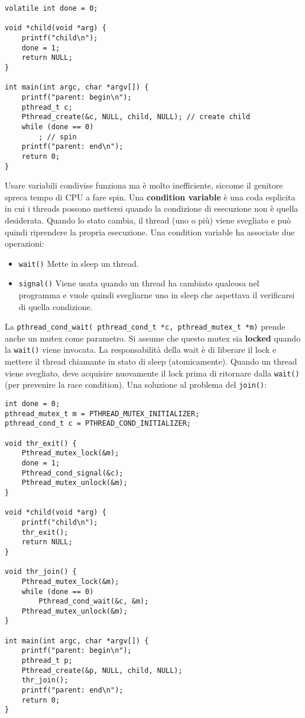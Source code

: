 \documentclass[12pt, twoside, letterpaper]{article}
\begin{document}
			\begin{lstlisting}[style=CStyle]
volatile int done = 0;

void *child(void *arg) {
	printf("child\n");
	done = 1;
	return NULL;
}

int main(int argc, char *argv[]) {
	printf("parent: begin\n");
	pthread_t c;
	Pthread_create(&c, NULL, child, NULL); // create child
	while (done == 0)
		; // spin
	printf("parent: end\n");
	return 0;
}			\end{lstlisting}
			Usare variabili condivise funziona ma è molto inefficiente, siccome il genitore spreca tempo di CPU a fare spin. Una \textbf{condition variable} è una coda esplicita in cui i threads possono mettersi quando la condizione di esecuzione non è quella desiderata. Quando lo stato cambia, il thread (uno o più) viene svegliato e può quindi riprendere la propria esecuzione.
			Una condition variable ha associate due operazioni: 
			\begin{itemize}
				\item \texttt{wait()} Mette in sleep un thread.
				\item \texttt{signal()} Viene usata quando un thread ha cambiato qualcosa nel programma e vuole quindi svegliarne uno in sleep che aspettava il verificarsi di quella condizione. 
			\end{itemize}
			La \texttt{pthread\_cond\_wait( pthread\_cond\_t *c, pthread\_mutex\_t *m)} prende anche un mutex come parametro. Si assume che questo mutex sia \textbf{locked} quando la \texttt{wait()} viene invocata. La responsabilità della wait è di liberare il lock e mettere il thread chiamante in stato di sleep (atomicamente). Quando un thread viene svegliato, deve acquisire nuovamente il lock prima di ritornare dalla \texttt{wait()} (per prevenire la race condition). Una soluzione al problema del \texttt{join()}:
			\begin{lstlisting}[style=CStyle]
int done = 0;
pthread_mutex_t m = PTHREAD_MUTEX_INITIALIZER;
pthread_cond_t c = PTHREAD_COND_INITIALIZER;

void thr_exit() {
	Pthread_mutex_lock(&m);
	done = 1;
	Pthread_cond_signal(&c);
	Pthread_mutex_unlock(&m);
}

void *child(void *arg) {
	printf("child\n");
	thr_exit();
	return NULL;
}

void thr_join() {
	Pthread_mutex_lock(&m);
	while (done == 0)
		Pthread_cond_wait(&c, &m);
	Pthread_mutex_unlock(&m);
}

int main(int argc, char *argv[]) {
	printf("parent: begin\n");
	pthread_t p;
	Pthread_create(&p, NULL, child, NULL);
	thr_join();
	printf("parent: end\n");
	return 0;
}			\end{lstlisting}
\end{document}
